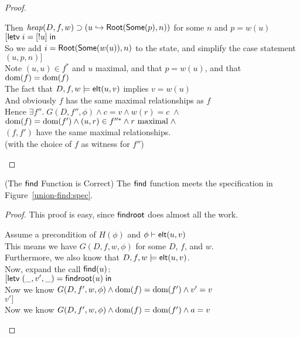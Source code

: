 \begin{proof}
\begin{tabbedproof}
\oooo Then $\mathit{heap}(D,f,w) \supset (u \hookrightarrow \mathsf{Root}(\mathsf{Some}(p), n))$ for some $n$ and $p = w(u)$\\
\oooo $[\mathsf{letv}\;i = [!u]\;\mathsf{in}\;$ \\
\oooo So we add $i = \mathsf{Root}(\mathsf{Some}(w(u)), n)$ to the state, and simplify the case statement \\
\oooo $(u, p, n)]$\\
\oooo Note $(u, u) \in f^*$ and $u$ maximal, and that $p = w(u)$, and that $\mbox{dom}({f}) = \mbox{dom}({f})$ \\
\oooo The fact that $D, f, w \models \mathsf{elt}({u}, {v})$ implies $v = w(u)$\\ 
\oooo And obviously $f$ has the same maximal relationships as $f$ \\
\oooo Hence $\exists f''.\;G(D, f'', \phi) \land c = v \land w(r) = c \;\land$ \\
\oooox $\mbox{dom}({f}) = \mbox{dom}({f'}) \land (u,r) \in f''^{*} \land r\mbox{ maximal} \;\land$ \\
\oooox $(f,f')$ have the same maximal relationships. \\
\oooo (with the choice of $f$ as witness for $f''$) \\
\end{tabbedproof}
\end{proof}

\begin{lemma}{(The $\mathsf{find}$ Function is Correct)}
  The $\mathsf{find}$ function meets the specification in Figure~\ref{union-find:spec}. 
\end{lemma}

\begin{proof}
This proof is easy, since $\mathsf{findroot}$ does almost all the work.
\begin{tabbedproof}
\oo Assume a precondition of $H(\phi)$ and ${\phi} \vdash \mathsf{elt}({u}, {v})$ \\
\ooo This means we have $G(D, f, w, \phi)$ for some $D$, $f$, and $ w$. \\
\ooo Furthermore, we also know that $D, f, w \models \mathsf{elt}({u}, {v})$. \\
\ooo Now, expand the call $\mathsf{find}(u)$: \\
\ooo $[\mathsf{letv}\;(\_, v', \_) = \mathsf{findroot}(u)\;\mathsf{in}\;$ \\
\ooo Now we know $G(D, f', w, \phi) \land \mbox{dom}({f}) = \mbox{dom}({f'}) \land v' = v$ \\
\ooo $v']$ \\
\ooo Now we know $G(D, f', w, \phi) \land \mbox{dom}({f}) = \mbox{dom}({f'}) \land a = v$ 
\end{tabbedproof}
\end{proof}

